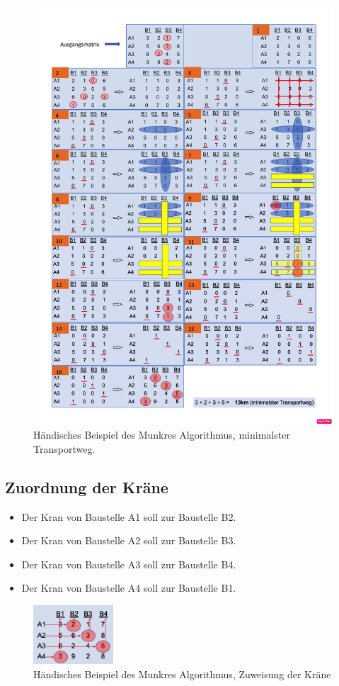 \begin{figure}
\centering
\includegraphics[width=14cm]{papers/munkres/figures/Ungarische_Methode_Beispiel.png}
\caption{Händisches Beispiel des Munkres Algorithmus, minimalster Transportweg.}
\label{munkres:Vr2}
\end{figure}

\subsection{Zuordnung der Kräne
\label{munkres:subsection:malorum}}

\begin{itemize}
\item Der Kran von Baustelle A1 soll zur Baustelle B2.
\item Der Kran von Baustelle A2 soll zur Baustelle B3.
\item Der Kran von Baustelle A3 soll zur Baustelle B4.
\item Der Kran von Baustelle A4 soll zur Baustelle B1.
\end{itemize}

\begin{figure}
\centering
\includegraphics[width=3cm]{papers/munkres/figures/Ungarische_Methode_Beispiel_Zuw.png}
\caption{Händisches Beispiel des Munkres Algorithmus, Zuweisung der Kräne }
\label{munkres:Vr2}
\end{figure}

